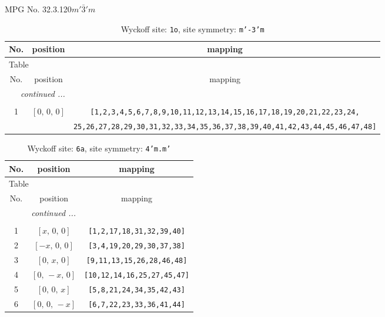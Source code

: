\documentclass[fleqn,8pt]{jsarticle}
\begin{document}
\setcounter{MaxMatrixCols}{32}

\renewcommand{\tablename}{Table~}
\renewcommand{\figurename}{Figure~}
\begin{center}
\LARGE
MPG No. 32.3.120\quad$m'\bar{3}'m$
\end{center}
\renewcommand{\arraystretch}{1.2}
\begin{longtable}{ccc}
\caption{Wyckoff site: {\tt 1o}, site symmetry: {\tt m'-3'm}}
 \\
 \hline \hline
No. & position & mapping \\ \hline \endfirsthead

\multicolumn{2}{l}{\tablename\ \thetable{}} \\
 \hline \hline
No. & position & mapping \\ \hline \endhead

 \hline \hline
\multicolumn{2}{r}{\footnotesize\it continued ...} \\ \endfoot

 \hline \hline
\multicolumn{2}{r}{} \\ \endlastfoot

1 & $\left[ 0,\, 0,\, 0 \right]$ & {\tt [1,2,3,4,5,6,7,8,9,10,11,12,13,14,15,16,17,18,19,20,21,22,23,24,} \\ \hline
 &  & {\tt 25,26,27,28,29,30,31,32,33,34,35,36,37,38,39,40,41,42,43,44,45,46,47,48]} \\
\end{longtable}
\renewcommand{\arraystretch}{1.2}
\begin{longtable}{ccc}
\caption{Wyckoff site: {\tt 6a}, site symmetry: {\tt 4'm.m'}}
 \\
 \hline \hline
No. & position & mapping \\ \hline \endfirsthead

\multicolumn{2}{l}{\tablename\ \thetable{}} \\
 \hline \hline
No. & position & mapping \\ \hline \endhead

 \hline \hline
\multicolumn{2}{r}{\footnotesize\it continued ...} \\ \endfoot

 \hline \hline
\multicolumn{2}{r}{} \\ \endlastfoot

1 & $\left[ x,\, 0,\, 0 \right]$ & {\tt [1,2,17,18,31,32,39,40]} \\ \hline
2 & $\left[ - x,\, 0,\, 0 \right]$ & {\tt [3,4,19,20,29,30,37,38]} \\ \hline
3 & $\left[ 0,\, x,\, 0 \right]$ & {\tt [9,11,13,15,26,28,46,48]} \\ \hline
4 & $\left[ 0,\, - x,\, 0 \right]$ & {\tt [10,12,14,16,25,27,45,47]} \\ \hline
5 & $\left[ 0,\, 0,\, x \right]$ & {\tt [5,8,21,24,34,35,42,43]} \\ \hline
6 & $\left[ 0,\, 0,\, - x \right]$ & {\tt [6,7,22,23,33,36,41,44]} \\
\end{longtable}
\end{document}
